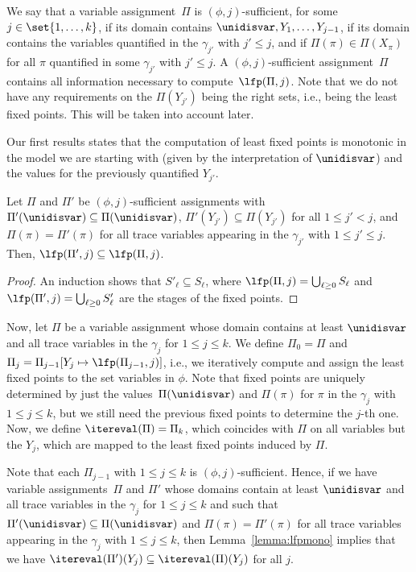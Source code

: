 We say that a variable assignment~$\Pi$ is $(\phi,j)$-sufficient, for some $j \in \set{1, \ldots, k}$, if its domain contains $\unidisvar,Y_1, \ldots, Y_{j-1}$, if its domain contains the variables quantified in the $\gamma_{j'}$ with $j' \le j$, and if $\Pi(\pi) \in \Pi(X_\pi)$ for all $\pi$ quantified in some $\gamma_{j'}$ with $j' \le j$.
A $(\phi,j)$-sufficient assignment~$\Pi$ contains all information necessary to compute~$\lfp(\Pi, j)$.
Note that we do not have any requirements on the $\Pi(Y_{j'})$ being the right sets, i.e., being the least fixed points.
This will be taken into account later. 

Our first results states that the computation of least fixed points is monotonic in the model we are starting with (given by the interpretation of $\unidisvar$) and the values for the previously quantified $Y_{j'}$.

\begin{lem}
\label{lemma:lfpmono}
Let $\Pi$ and $\Pi'$ be $(\phi, j)$-sufficient assignments with $\Pi'(\unidisvar) \subseteq \Pi(\unidisvar)$, $\Pi'(Y_{j'}) \subseteq \Pi(Y_{j'})$ for all $1 \le j' < j$, and $\Pi(\pi) = \Pi'(\pi)$ for all trace variables appearing in the $\gamma_{j'}$ with $1 \le j' \le j$.
Then, $\lfp(\Pi',j) \subseteq \lfp(\Pi,j)$.
\end{lem}

\begin{proof}
An induction shows that $S'_\ell \subseteq S_\ell$, where $\lfp(\Pi, j) = \bigcup_{\ell\ge 0} S_\ell$ and $\lfp(\Pi', j) = \bigcup_{\ell\ge 0} S'_\ell$ are the stages of the fixed points.
\end{proof}

Now, let $\Pi$ be a variable assignment whose domain contains at least $\unidisvar$ and all trace variables in the $\gamma_j$ for $1 \le j \le k$.
We define $\Pi_0 = \Pi$ and $\Pi_j = \Pi_{j-1}[Y_j \mapsto \lfp(\Pi_{j-1},j)]$, i.e., we iteratively compute and assign the least fixed points to the set variables in $\phi$.
Note that fixed points are uniquely determined by just the values~$\Pi(\unidisvar)$ and $\Pi(\pi)$ for $\pi$ in the $\gamma_j$ with $1\le j \le k$, but we still need the previous fixed points to determine the $j$-th one. 
Now, we define $\itereval(\Pi) = \Pi_k$, which coincides with $\Pi$ on all variables but the $Y_j$, which are mapped to the least fixed points induced by $\Pi$.

\begin{rem}
\label{remark:lfpmonoiter}
Note that each $\Pi_{j-1}$ with $1 \le j \le k$ is $(\phi,j)$-sufficient.
Hence, if we have variable assignments~$\Pi$ and $\Pi'$ whose domains contain at least $\unidisvar$ and all trace variables in the $\gamma_j$ for $1 \le j \le k$ and such that $\Pi'(\unidisvar) \subseteq \Pi(\unidisvar)$ and $\Pi(\pi) = \Pi'(\pi)$ for all trace variables appearing in the $\gamma_{j}$ with $1 \le j \le k$, then Lemma~\ref{lemma:lfpmono} implies that we have $\itereval(\Pi')(Y_j) \subseteq \itereval(\Pi)(Y_j)$ for all $j$.
\end{rem}

